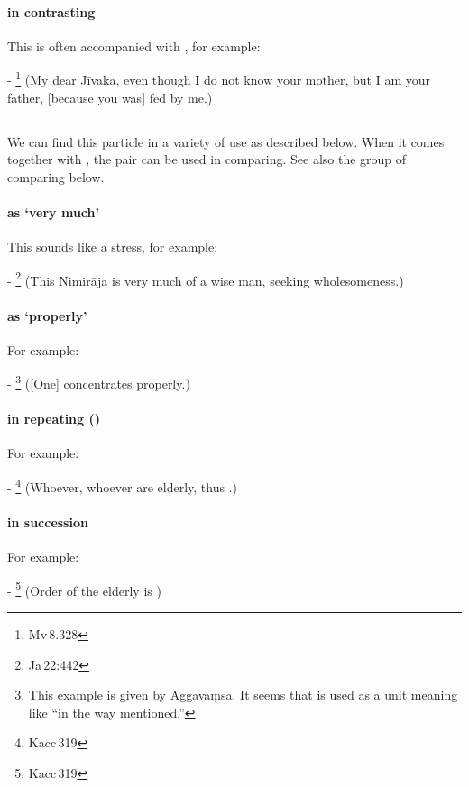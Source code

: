 \paragraph*{ in contrasting} This is often accompanied with , for example:\par
- \footnote{Mv\,8.328} (My dear J\=ivaka, even though I do not know your mother, but I am your father, [because you was] fed by me.) \par

\subsection*{}\label{nip:yathaa1}
We can find this particle in a variety of use as described below. When it comes together with , the pair can be used in comparing. See also the group of comparing below.
\paragraph*{ as `very much'} This sounds like a stress, for example:\par
- \footnote{Ja\,22:442} (This Nimir\=aja is very much of a wise man, seeking wholesomeness.) \par
\paragraph*{ as `properly'} For example:\par
- \footnote{This example is given by Aggava\d msa. It seems that  is used as a unit meaning like ``in the way mentioned.''} ([One] concentrates properly.) \par
\paragraph*{ in repeating ()} For example:\par
- \footnote{Kacc\,319} (Whoever, whoever are elderly, thus .) \par
\paragraph*{ in succession} For example:\par
- \footnote{Kacc\,319} (Order of the elderly is ) \par
